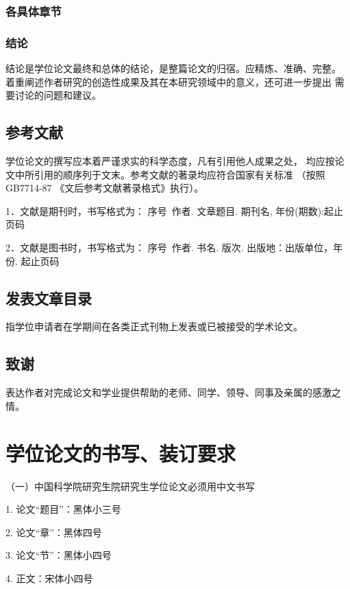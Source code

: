 \subsubsection{各具体章节}

\subsubsection{结论}

结论是学位论文最终和总体的结论，是整篇论文的归宿。应精炼、准确、完整。
着重阐述作者研究的创造性成果及其在本研究领域中的意义，还可进一步提出
需要讨论的问题和建议。

\subsection{参考文献}

学位论文的撰写应本着严谨求实的科学态度，凡有引用他人成果之处，
均应按论文中所引用的顺序列于文末。参考文献的著录均应符合国家有关标准
（按照GB7714-87 《文后参考文献著录格式》执行）。

1．文献是期刊时，书写格式为： 序号\ 作者. 文章题目. 期刊名,
年份(期数):起止页码

2．文献是图书时，书写格式为： 序号\ 作者. 书名. 版次. 出版地：出版单位，年份.
起止页码

\subsection{发表文章目录}

指学位申请者在学期间在各类正式刊物上发表或已被接受的学术论文。

\subsection{致谢}

表达作者对完成论文和学业提供帮助的老师、同学、领导、同事及亲属的感激之情。

\section{学位论文的书写、装订要求}

（一）中国科学院研究生院研究生学位论文必须用中文书写

1. 论文``题目''：黑体小三号

2. 论文``章''：黑体四号

3. 论文``节''：黑体小四号

4. 正文：宋体小四号

